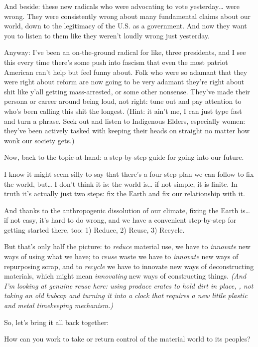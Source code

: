 \documentclass[11pt]{article}
\begin{document}
\begin{itemize}
And beside: these new radicals who were advocating to vote yesterday… were wrong. They were consistently wrong about many fundamental claims about our world, down to the legitimacy of the U.S. as a government. And now they want you to listen to them like they weren’t loudly wrong just yesterday.

Anyway: I’ve been an on-the-ground radical for like, three presidents, and I see this every time there’s some push into fascism that even the most patriot American can’t help but feel funny about. Folk who were so adamant that they were right about reform are now going to be very adamant they’re right about shit like y’all getting mass-arrested, or some other nonsense. They’ve made their persona or career around being loud, not right: tune out and pay attention to who’s been calling this shit the longest. (Hint: it ain’t me, I can just type fast and turn a phrase. Seek out and listen to Indigenous Elders, especially women: they’ve been actively tasked with keeping their heads on straight no matter how wonk our society gets.)

Now, back to the topic-at-hand: a step-by-step guide for going into our future.

I know it might seem silly to say that there’s a four-step plan we can follow to fix the world, but… I don’t think it is: the world is… if not simple, it is finite. In truth it’s actually just two steps: fix the Earth and fix our relationship with it.

And thanks to the anthropogenic dissolution of our climate, fixing the Earth is… if not easy, it’s hard to do wrong, and we have a convenient step-by-step for getting started there, too: 1) Reduce, 2) Reuse, 3) Recycle.

But that’s only half the picture: to \emph{reduce} material use, we have to \emph{innovate} new ways of using what we have; to \emph{reuse} waste we have to \emph{innovate} new ways of repurposing scrap, and to \emph{recycle} we have to innovate new ways of deconstructing materials, which might mean \emph{innovating} new ways of constructing things. \emph{(And I’m looking at genuine reuse here: using produce crates to hold dirt in place, , not taking an old hubcap and turning it into a clock that requires a new little plastic and metal timekeeping mechanism.)}

So, let’s bring it all back together:

How can you work to take or return control of the material world to its peoples?


\end{itemize}
\end{document}
